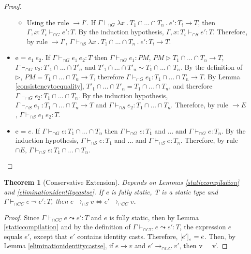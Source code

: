 \documentclass[a4paper]{article}
\newtheorem{theorem}{Theorem}
\begin{document}
\begin{proof}
\begin{itemize}
\begin{itemize}
        \item Using the rule ${\rightarrow} I'$.
        If $\Gamma \vdash_{\cap G} \lambda x\ .\ T_1 \cap \ldots \cap T_n\ .\ e' : T_i \rightarrow T$, then $\Gamma, x : T_i \vdash_{\cap G} e' : T$.
        By the induction hypothesis, $\Gamma, x : T_i \vdash_{\cap S} e' : T$.
        Therefore, by rule ${\rightarrow} I'$, $\Gamma \vdash_{\cap S} \lambda x\ .\ T_1 \cap \ldots \cap T_n\ .\ e' : T_i \rightarrow T$.
    \end{itemize}
    \item e = $e_1\ e_2$.
    If $\Gamma \vdash_{\cap G} e_1\ e_2 : T$ then $\Gamma \vdash_{\cap G} e_1 : PM$, $PM \rhd T_1 \cap \ldots \cap T_n \rightarrow T$, $\Gamma \vdash_{\cap G} e_2 : T'_1 \cap \ldots \cap T'_n$ and $T'_1 \cap \ldots \cap T'_n \sim T_1 \cap \ldots \cap T_n$.
    By the definition of $\rhd$, $PM = T_1 \cap \ldots \cap T_n \rightarrow T$, therefore $\Gamma \vdash_{\cap G} e_1 : T_1 \cap \ldots \cap T_n \rightarrow T$.
    By Lemma \ref{consistencytoequality}, $T'_1 \cap \ldots \cap T'_n = T_1 \cap \ldots \cap T_n$, and therefore $\Gamma \vdash_{\cap G} e_2 : T_1 \cap \ldots \cap T_n$.
    By the induction hypothesis, $\Gamma \vdash_{\cap S} e_1\ : T_1 \cap \ldots \cap T_n \rightarrow T$ and $\Gamma \vdash_{\cap S} e_2 : T_1 \cap \ldots \cap T_n$.
    Therefore, by rule ${\rightarrow} E$, $\Gamma \vdash_{\cap S} e_1\ e_2 : T$.
    \item e = $e$.
    If $\Gamma \vdash_{\cap G} e : T_1 \cap \ldots \cap T_n$ then $\Gamma \vdash_{\cap G} e : T_1$ and ... and $\Gamma \vdash_{\cap G} e : T_n$.
    By the induction hypothesis, $\Gamma \vdash_{\cap S} e : T_1$ and ... and $\Gamma \vdash_{\cap S} e : T_n$.
    Therefore, by rule ${\cap} E$, $\Gamma \vdash_{\cap S} e : T_1 \cap \ldots \cap T_n$.\\
\end{itemize}
\end{proof}

\begin{theorem}[Conservative Extension]
\label{equivalence}
Depends on Lemmas \ref{staticcompilation} and \ref{eliminationidentitycastse}.
If e is fully static, T is a static type and $\Gamma \vdash_{\cap CC} e \leadsto e' : T$, then $e \longrightarrow_{\cap S} v \iff e' \longrightarrow_{\cap CC} v$.
\end{theorem}
\begin{proof}
Since $\Gamma \vdash_{\cap CC} e \leadsto e' : T$ and $e$ is fully static, then by Lemma \ref{staticcompilation} and by the definition of $\Gamma \vdash_{\cap CC} e \leadsto e' : T$, the expression $e$ equals $e'$, except that $e'$ contains identity casts.
Therefore, $[e']_{_e} = e$.
Then, by Lemma \ref{eliminationidentitycastse}, if $e \longrightarrow v$ and $e' \longrightarrow_{\cap CC} v'$, then v = v'.
\end{proof}
\end{document}
